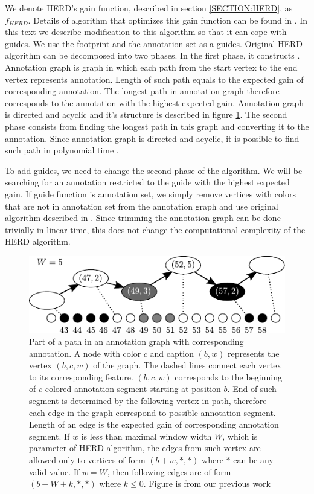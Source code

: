 We denote HERD's gain function, described in section \ref{SECTION:HERD}, as
$f_{HERD}$.  Details of algorithm that optimizes this gain function can be found
in \cite{Nanasi2010, Nanasi2010mgr}. In this text we describe modification to
this algorithm so that it can cope with guides. We use the footprint and the
annotation set as a guides. Original HERD algorithm can be decomposed into two
phases. In the first phase, it constructs .
Annotation graph is graph in which each path from the start vertex to the end
vertex represents annotation. Length of such path equals to the expected gain of
corresponding annotation. The longest path in annotation graph therefore
corresponds to the annotation with the highest expected gain. Annotation graph
is directed and acyclic and it's structure is described in figure
\ref{HERD:figure:annotation_graph}.  The second phase consists from finding the
longest path in this graph and converting it to the annotation. Since annotation
graph is directed and acyclic, it is possible to find such path in polynomial
time \cite{Nanasi2010mgr}.

To add guides, we need to change the second phase of the algorithm. We will be
searching for an annotation restricted to the guide with the highest expected
gain.  If guide function is annotation set,  we simply remove vertices with
colors that are not in annotation set from the annotation graph and use original
algorithm described in \cite{Nanasi2010mgr}. Since trimming the annotation graph
can be done trivially in linear time, this does not change the computational
complexity of the HERD algorithm. 

\begin{figure}
\begin{center}
\includegraphics{../figures/herd_graph}
\end{center} 
\caption[Annotation graph]{Part of a path in an annotation graph with
corresponding annotation. A node with color $c$ and caption $(b,w)$ represents
the vertex $(b,c,w)$ of the graph. The dashed lines connect each vertex to its
corresponding feature. $(b, c, w)$ corresponds to the beginning of $c$-colored
annotation segment starting at position $b$. End of such segment is determined
by the following vertex in path, therefore each edge in the graph correspond to
possible annotation segment. Length of an edge is the expected gain of
corresponding annotation segment. If $w$ is less than maximal window width $W$,
which is parameter of HERD algorithm, the edges from such vertex are allowed
only to vertices of form $(b+w, *, *)$ where $*$ can be any valid value. If
$w=W$, then following edges are of form $(b+W+k, *, *)$ where $k\leq0$.  Figure is
from our previous work \cite{Nanasi2010mgr}}\label{HERD:figure:annotation_graph} 
\end{figure}

